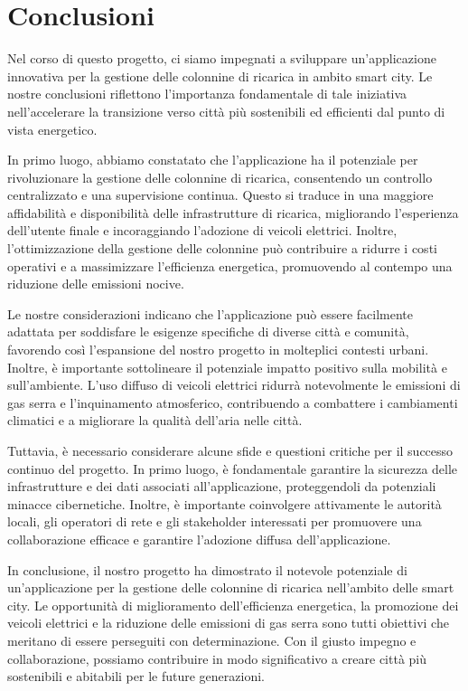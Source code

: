 



\section{Conclusioni}

Nel corso di questo progetto, ci siamo impegnati a sviluppare un'applicazione innovativa per la gestione delle colonnine di ricarica in ambito smart city. Le nostre conclusioni riflettono l'importanza fondamentale di tale iniziativa nell'accelerare la transizione verso città più sostenibili ed efficienti dal punto di vista energetico.

In primo luogo, abbiamo constatato che l'applicazione ha il potenziale per rivoluzionare la gestione delle colonnine di ricarica, consentendo un controllo centralizzato e una supervisione continua. Questo si traduce in una maggiore affidabilità e disponibilità delle infrastrutture di ricarica, migliorando l'esperienza dell'utente finale e incoraggiando l'adozione di veicoli elettrici. Inoltre, l'ottimizzazione della gestione delle colonnine può contribuire a ridurre i costi operativi e a massimizzare l'efficienza energetica, promuovendo al contempo una riduzione delle emissioni nocive.

Le nostre considerazioni indicano che l'applicazione può essere facilmente adattata per soddisfare le esigenze specifiche di diverse città e comunità, favorendo così l'espansione del nostro progetto in molteplici contesti urbani. Inoltre, è importante sottolineare il potenziale impatto positivo sulla mobilità e sull'ambiente. L'uso diffuso di veicoli elettrici ridurrà notevolmente le emissioni di gas serra e l'inquinamento atmosferico, contribuendo a combattere i cambiamenti climatici e a migliorare la qualità dell'aria nelle città.

Tuttavia, è necessario considerare alcune sfide e questioni critiche per il successo continuo del progetto. In primo luogo, è fondamentale garantire la sicurezza delle infrastrutture e dei dati associati all'applicazione, proteggendoli da potenziali minacce cibernetiche. Inoltre, è importante coinvolgere attivamente le autorità locali, gli operatori di rete e gli stakeholder interessati per promuovere una collaborazione efficace e garantire l'adozione diffusa dell'applicazione.

In conclusione, il nostro progetto ha dimostrato il notevole potenziale di un'applicazione per la gestione delle colonnine di ricarica nell'ambito delle smart city. Le opportunità di miglioramento dell'efficienza energetica, la promozione dei veicoli elettrici e la riduzione delle emissioni di gas serra sono tutti obiettivi che meritano di essere perseguiti con determinazione. Con il giusto impegno e collaborazione, possiamo contribuire in modo significativo a creare città più sostenibili e abitabili per le future generazioni.

\newpage